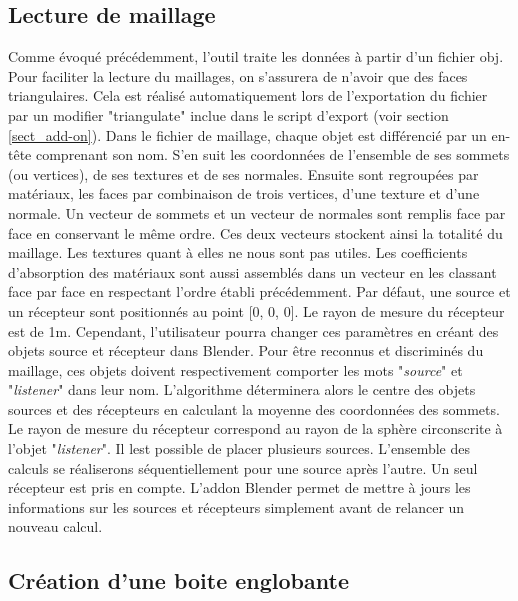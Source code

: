 \subsection{Lecture de maillage}
Comme évoqué précédemment, l'outil traite les données à partir d'un fichier \gls{obj}. Pour faciliter la lecture du maillages, on s'assurera de n'avoir que des faces triangulaires. Cela est réalisé automatiquement lors de l'exportation du fichier par un \gls{modifier} "triangulate" inclue dans le script d'export (voir section \ref{sect_add-on}). Dans le fichier de maillage, chaque objet est différencié par un en-tête comprenant son nom. S'en suit les coordonnées de l'ensemble de ses sommets (ou vertices), de ses textures et de ses normales. Ensuite sont regroupées par matériaux, les faces par combinaison de trois vertices, d'une texture et d'une normale. Un vecteur de sommets et un vecteur de normales sont remplis face par face en conservant le même ordre. Ces deux vecteurs stockent ainsi la totalité du maillage. Les textures quant à elles ne nous sont pas utiles. Les coefficients d'absorption des matériaux sont aussi assemblés dans un vecteur en les classant face par face en respectant l'ordre établi précédemment.
Par défaut, une source et un récepteur sont positionnés au point [0, 0, 0]. Le rayon de mesure du récepteur est de 1m. Cependant, l'utilisateur pourra changer ces paramètres en créant des objets source et récepteur dans Blender. Pour être reconnus et discriminés du maillage, ces objets doivent respectivement comporter les mots "\textit{source}" et "\textit{listener}" dans leur nom. L'algorithme déterminera alors le centre des objets sources et des récepteurs en calculant la moyenne des coordonnées des sommets. Le rayon de mesure du récepteur correspond au rayon de la sphère circonscrite à l'objet "\textit{listener}". Il lest possible de placer plusieurs sources. L'ensemble des calculs se réaliserons séquentiellement pour une source après l'autre. Un seul récepteur est pris en compte. L'addon Blender permet de mettre à jours les informations sur les sources et récepteurs simplement avant de relancer un nouveau calcul.



\subsection{Création d'une boite englobante}

